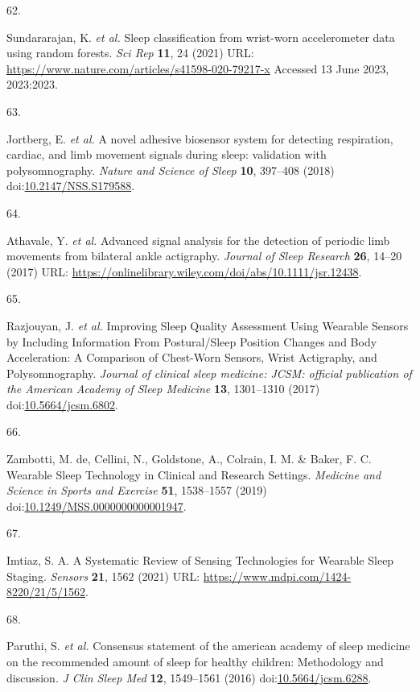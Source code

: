 \documentclass[
  9pt,
]{scrbook}
\newlength{\cslhangindent}
\newlength{\csllabelwidth}
\newlength{\cslentryspacingunit} %
\newenvironment{CSLReferences}[2] %
 {%
  \setlength{\parindent}{0pt}
  \ifodd #1
  \let\oldpar\par
  \def\par{\hangindent=\cslhangindent\oldpar}
  \fi
  \setlength{\parskip}{#2\cslentryspacingunit}
 }%
 {}
\newcommand{\CSLLeftMargin}[1]{\parbox[t]{\csllabelwidth}{#1}}
\newcommand{\CSLRightInline}[1]{\parbox[t]{\linewidth - \csllabelwidth}{#1}\break}
\begin{document}
\begin{CSLReferences}{0}{0}
\leavevmode{}%
\CSLLeftMargin{62. }%
\CSLRightInline{Sundararajan, K. \emph{et al.} Sleep classification from
wrist-worn accelerometer data using random forests. \emph{Sci Rep}
\textbf{11}, 24 (2021) URL:
\url{https://www.nature.com/articles/s41598-020-79217-x} Accessed 13
June 2023, 2023:2023.}

\leavevmode{}%
\CSLLeftMargin{63. }%
\CSLRightInline{Jortberg, E. \emph{et al.} A novel adhesive biosensor
system for detecting respiration, cardiac, and limb movement signals
during sleep: validation with polysomnography. \emph{Nature and Science
of Sleep} \textbf{10}, 397--408 (2018)
doi:\href{https://doi.org/10.2147/NSS.S179588}{10.2147/NSS.S179588}.}

\leavevmode{}%
\CSLLeftMargin{64. }%
\CSLRightInline{Athavale, Y. \emph{et al.} Advanced signal analysis for
the detection of periodic limb movements from bilateral ankle
actigraphy. \emph{Journal of Sleep Research} \textbf{26}, 14--20 (2017)
URL: \url{https://onlinelibrary.wiley.com/doi/abs/10.1111/jsr.12438}.}

\leavevmode{}%
\CSLLeftMargin{65. }%
\CSLRightInline{Razjouyan, J. \emph{et al.} Improving Sleep Quality
Assessment Using Wearable Sensors by Including Information From
Postural/Sleep Position Changes and Body Acceleration: A Comparison of
Chest-Worn Sensors, Wrist Actigraphy, and Polysomnography. \emph{Journal
of clinical sleep medicine: JCSM: official publication of the American
Academy of Sleep Medicine} \textbf{13}, 1301--1310 (2017)
doi:\href{https://doi.org/10.5664/jcsm.6802}{10.5664/jcsm.6802}.}

\leavevmode{}%
\CSLLeftMargin{66. }%
\CSLRightInline{Zambotti, M. de, Cellini, N., Goldstone, A., Colrain, I.
M. \& Baker, F. C. Wearable Sleep Technology in Clinical and Research
Settings. \emph{Medicine and Science in Sports and Exercise}
\textbf{51}, 1538--1557 (2019)
doi:\href{https://doi.org/10.1249/MSS.0000000000001947}{10.1249/MSS.0000000000001947}.}

\leavevmode{}%
\CSLLeftMargin{67. }%
\CSLRightInline{Imtiaz, S. A. A Systematic Review of Sensing
Technologies for Wearable Sleep Staging. \emph{Sensors} \textbf{21},
1562 (2021) URL: \url{https://www.mdpi.com/1424-8220/21/5/1562}.}

\leavevmode{}%
\CSLLeftMargin{68. }%
\CSLRightInline{Paruthi, S. \emph{et al.} Consensus statement of the
american academy of sleep medicine on the recommended amount of sleep
for healthy children: Methodology and discussion. \emph{J Clin Sleep
Med} \textbf{12}, 1549--1561 (2016)
doi:\href{https://doi.org/10.5664/jcsm.6288}{10.5664/jcsm.6288}.}


\end{CSLReferences}
\end{document}
